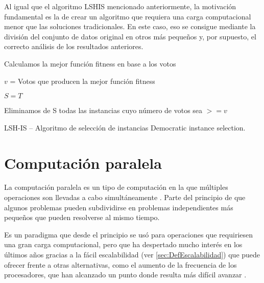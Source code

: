 Al igual que el algoritmo LSHIS mencionado anteriormente, la motivación fundamental es la de crear un algoritmo que requiera una carga computacional menor que las soluciones tradicionales. En este caso, eso se consigue mediante la división del conjunto de datos original en otros más pequeños y, por supuesto, el correcto análisis de los resultados anteriores.


\begin{algorithm*}
\DontPrintSemicolon
{}

Calculamos la mejor función fitness en base a los votos

$v$ = Votos que producen la mejor función fitness

$S = T$

Eliminamos de S todas las instancias cuyo número de votos sea $>= v$

\caption{LSH-IS -- Algoritmo de selección de instancias Democratic instance selection. \cite{DemoISPaper}}
\label{alg:DemoIS}
\end{algorithm*}




\section{Computación paralela}\label{sec:CompParalela}

La computación paralela es un tipo de computación en la que múltiples operaciones son llevadas a cabo simultáneamente \cite{Almasi:1989}. Parte del principio de que algunos problemas pueden subdividirse en problemas independientes más pequeños que pueden resolverse al mismo tiempo.

Es un paradigma que desde el principio se usó para operaciones que requiriesen una gran carga computacional, pero que ha despertado mucho interés en los últimos años gracias a la fácil escalabilidad (ver \ref{sec:DefEscalabilidad}) que puede ofrecer frente a otras alternativas, como el aumento de la frecuencia de los procesadores, que han alcanzado un punto donde resulta más difícil avanzar \cite{CompParalelaWiki}.


